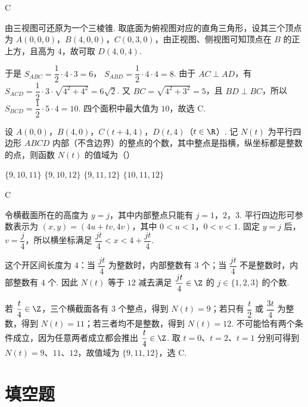 \begin{answer}
C
\end{answer}

\begin{solution}
由三视图可还原为一个三棱锥. 取底面为俯视图对应的直角三角形，设其三个顶点为 \(A(0,0,0)\)，\(B(4,0,0)\)，\(C(0,3,0)\)，由正视图、侧视图可知顶点在 \(B\) 的正上方，且高为 \(4\)，故可取 \(D(4,0,4)\).

于是
\(S_{ABC}=\dfrac12\cdot4\cdot3=6\)，
\(S_{ABD}=\dfrac12\cdot4\cdot4=8\). 由于 \(AC\perp AD\)，有
\(S_{ACD}=\dfrac12\cdot3\cdot\sqrt{4^2+4^2}=6\sqrt2\). 又 \(BC=\sqrt{4^2+3^2}=5\)，且 \(BD\perp BC\)，所以
\(S_{BCD}=\dfrac12\cdot5\cdot4=10\). 四个面积中最大值为 \(10\)，故选 C.
\end{solution}

\begin{problem}
设 \(A(0, 0)\)，\(B(4, 0)\)，\(C(t + 4, 4)\)，\(D(t, 4)\)（\(t \in \R\)）. 记 \(N(t)\) 为平行四边形 \(ABCD\) 内部（不含边界）的整点的个数，其中整点是指横，纵坐标都是整数的点，则函数 \(N(t)\) 的值域为（\quad）

\choices
    {\(\{9, 10, 11\}\)}
    {\(\{9, 10, 12\}\)}
    {\(\{9, 11, 12\}\)}
    {\(\{10, 11, 12\}\)}
\end{problem}

\begin{answer}
C
\end{answer}

\begin{solution}
令横截面所在的高度为 \(y=j\)，其中内部整点只能有 \(j=1\)，\(2\)，\(3\). 平行四边形可参数表示为
\((x,y)=(4u+tv,4v)\)，其中 \(0<u<1\)，\(0<v<1\). 固定 \(y=j\) 后，\(v=\dfrac j4\)，所以横坐标满足
\(\dfrac{jt}{4}<x<4+\dfrac{jt}{4}\).

这个开区间长度为 \(4\)：当 \(\dfrac{jt}{4}\) 为整数时，内部整数有 \(3\) 个；当 \(\dfrac{jt}{4}\) 不是整数时，内部整数有 \(4\) 个. 因此 \(N(t)\) 等于 \(12\) 减去满足 \(\dfrac{jt}{4}\in\Z\) 的 \(j\in\{1,2,3\}\) 的个数.

若 \(\dfrac t4\in\Z\)，三个横截面各有 \(3\) 个整点，得到 \(N(t)=9\)；若只有 \(\dfrac t2\) 或 \(\dfrac{3t}{4}\) 为整数，得到 \(N(t)=11\)；若三者均不是整数，得到 \(N(t)=12\). 不可能恰有两个条件成立，因为任意两者成立都会推出 \(\dfrac t4\in\Z\). 取 \(t=0\)、\(t=2\)、\(t=1\) 分别可得到 \(N(t)=9\)、\(11\)、\(12\)，故值域为 \(\{9,11,12\}\)，选 C.
\end{solution}

\section{填空题}

